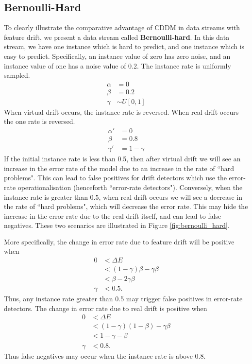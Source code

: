 \subsection{Bernoulli-Hard}

To clearly illustrate the comparative advantage of CDDM in data streams with feature drift, we present a data stream called {\bf Bernoulli-hard}. In this data stream, we have one instance which is hard to predict, and one instance which is easy to predict. Specifically, an instance value of zero has zero noise, and an instance value of one has a noise value of 0.2. The instance rate is uniformly sampled.
\begin{align}
  \alpha &= 0 \\
  \beta &= 0.2 \\
  \gamma &\sim U[0,1]
\end{align}
When virtual drift occurs, the instance rate is reversed. When real drift occurs the one rate is reversed.
\begin{align}
  \alpha' &= 0 \\
  \beta &= 0.8 \\
  \gamma' &= 1 - \gamma
\end{align}
If the initial instance rate is less than 0.5, then after virtual drift we will see an increase in the error rate of the model due to an increase in the rate of ``hard problems". This can lead to false positives for drift detectors which use the error-rate operationalisation (henceforth ``error-rate detectors"). Conversely, when the instance rate is greater than 0.5, when real drift occurs we will see a decrease in the rate of ``hard problems", which will decrease the error rate. This may hide the increase in the error rate due to the real drift itself, and can lead to false negatives. These two scenarios are illustrated in Figure \ref{fig:bernoulli_hard}.

More specifically, the change in error rate due to feature drift will be positive when
\begin{align}
  0 &< \Delta E \\
  &< (1-\gamma)\beta - \gamma \beta \\
  &< \beta-2\gamma\beta \\
  \gamma &< 0.5.
\end{align}
Thus, any instance rate greater than 0.5 may trigger false positives in error-rate detectors. The change in error rate due to real drift is positive when
\begin{align}
  0 &< \Delta E \\
  &< (1-\gamma)(1-\beta) - \gamma\beta \\
  &< 1 - \gamma - \beta \\
  \gamma &< 0.8.
\end{align}
Thus false negatives may occur when the instance rate is above 0.8.

